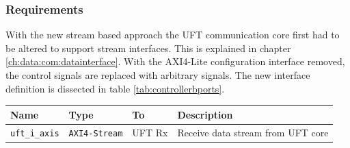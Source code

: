 \subsubsection*{Requirements}
With the new stream based approach the UFT communication core first had to be
altered to support stream interfaces. This is explained in chapter 
\ref{ch:data:com:datainterface}. With the AXI4-Lite configuration interface
removed, the
control signals are replaced with arbitrary signals. The new interface
definition is dissected in table \ref{tab:controllerbports}.

\begin{table}[t!]
    \centering
    \begin{tabular}{l l l p{8cm}}
        \toprule
        Name & Type & To & Description \\
        \midrule
        \texttt{uft\_i\_axis} & \texttt{AXI4-Stream} & UFT Rx &
        Receive data stream from UFT core
        \\


\end{tabular}
\end{table}
